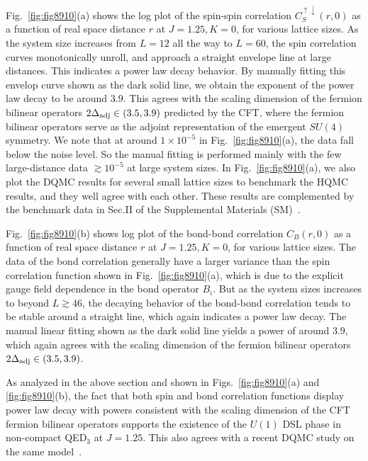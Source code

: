 \documentclass[aps,prl,twocolumn,superscriptaddress,showpacs,longbibliography]{revtex4-2}
\newcommand{\tx}[1]{\textmd{#1}}
\begin{document}
\vspace{3mm}

Fig.~\ref{fig:fig8910}(a) shows the log plot of the spin-spin correlation $C_S^{\uparrow \downarrow}(r, 0)$ as a function of real space distance $r$ at $J=1.25, K=0$, for various lattice sizes. As the system size increases from $L=12$ all the way to $L=60$, the spin correlation curves monotonically unroll, and approach a straight envelope line at large distances. This indicates a power law decay behavior. By manually fitting this envelop curve shown as the dark solid line, we obtain the exponent of the power law decay to be around $3.9$. This agrees with the scaling dimension of the fermion bilinear operators $2\Delta_\tx{adj} \in (3.5, 3.9)$ predicted by the CFT, where the fermion bilinear operators serve as the adjoint representation of the emergent $SU(4)$ symmetry. We note that at around $1\times10^{-5}$ in Fig.~\ref{fig:fig8910}(a), the data fall below the noise level. So the manual fitting is performed mainly with the few large-distance data $\gtrsim 10^{-5}$ at large system sizes. In Fig.~\ref{fig:fig8910}(a), we also plot the DQMC results for several small lattice sizes to benchmark the HQMC results, and they well agree with each other. These results are complemented by the benchmark data in Sec.II of the Supplemental Materials (SM)~\cite{suppl}.

Fig.~\ref{fig:fig8910}(b) shows log plot of the bond-bond correlation $C_B(r, 0)$ as a function of real space distance $r$ at $J=1.25, K=0$, for various lattice sizes. 
The data of the bond correlation generally have a larger variance than the spin correlation function shown in Fig.~\ref{fig:fig8910}(a), which is due to the explicit gauge field dependence in the bond operator $B_i$. 
But as the system sizes increases to beyond $L \gtrsim 46$, the decaying behavior of the bond-bond correlation tends to be stable around a straight line, which again indicates a power law decay. The manual linear fitting shown as the dark solid line yields a power of around $3.9$, which again agrees with the scaling dimension of the fermion bilinear operators $2\Delta_\tx{adj} \in (3.5, 3.9)$.

As analyzed in the above section and shown in Figs.~\ref{fig:fig8910}(a) and \ref{fig:fig8910}(b), the fact that both spin and bond correlation functions display power law decay with powers consistent with the scaling dimension of the CFT fermion bilinear operators supports the existence of the $U(1)$ DSL phase in non-compact QED$_3$ at $J=1.25$. 
This also agrees with a recent DQMC study on the same model~\cite{chenEmergent2025}.
\end{document}
